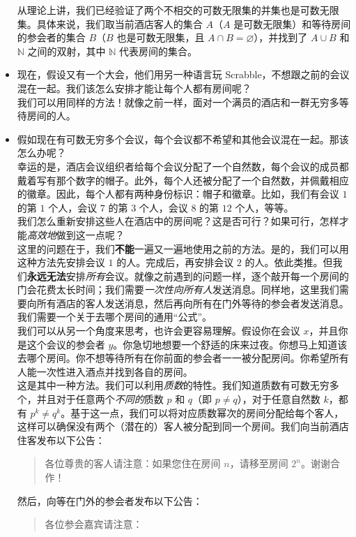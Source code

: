 \begin{itemize}
          从理论上讲，我们已经验证了两个不相交的可数无限集的并集也是可数无限集。具体来说，我们取当前酒店客人的集合 $A$（$A$ 是可数无限集）和等待房间的参会者的集合 $B$（$B$ 也是可数无限集，且 $A \cap B = \varnothing$），并找到了 $A \cup B$ 和 $\mathbb{N}$ 之间的双射，其中 $\mathbb{N}$ 代表房间的集合。\\
    \item 现在，假设又有一个大会，他们用另一种语言玩 Scrabble，不想跟之前的会议混在一起。我们该怎么安排才能让每个人都有房间呢？\\

          我们可以用同样的方法！就像之前一样，面对一个满员的酒店和一群无穷多等待房间的人。\\
    \item 假如现在有可数无穷多个会议，每个会议都不希望和其他会议混在一起。那该怎么办呢？\\

          幸运的是，酒店会议组织者给每个会议分配了一个自然数，每个会议的成员都戴着写有那个数字的帽子。此外，每个人还被分配了一个自然数，并佩戴相应的徽章。因此，每个人都有两种身份标识：帽子和徽章。比如，我们有会议 $1$ 的第 $1$ 个人，会议 $7$ 的第 $3$ 个人，会议 $8$ 的第 $12$ 个人，等等。\\

          我们怎么重新安排这些人在酒店中的房间呢？这是否可行？如果可行，怎样才能\emph{高效地}做到这一点呢？\\

          这里的问题在于，我们\textbf{不能}一遍又一遍地使用之前的方法。是的，我们可以用这种方法先安排会议 $1$ 的人。完成后，再安排会议 $2$ 的人。依此类推。但我们\textbf{永远无法}安排\emph{所有}会议。就像之前遇到的问题一样，逐个敲开每一个房间的门会花费太长时间；我们需要\emph{一次性向所有人}发送消息。同样地，这里我们需要向所有酒店的客人发送消息，然后再向所有在门外等待的参会者发送消息。我们需要一个关于去哪个房间的通用``公式''。\\

          我们可以从另一个角度来思考，也许会更容易理解。假设你在会议 $x$，并且你是这个会议的参会者 $y$。你急切地想要一个舒适的床来过夜。你想马上知道该去哪个房间。你不想等待所有在你前面的参会者一一被分配房间。你希望所有人能一次性进入酒点并找到各自的房间。\\

          这是其中一种方法。我们可以利用\emph{质数}的特性。我们知道质数有可数无穷多个，并且对于任意两个\emph{不同的}质数 $p$ 和 $q$（即 $p \ne q$），对于任意自然数 $k$，都有 $p^k \ne q^k$。基于这一点，我们可以将对应质数幂次的房间分配给每个客人，这样可以确保没有两个（潜在的）客人被分配到同一个房间。我们向当前酒店住客发布以下公告：
          \begin{quotation}
              各位尊贵的客人请注意：如果您住在房间 $n$，请移至房间 $2^n$。谢谢合作！
          \end{quotation}
          然后，向等在门外的参会者发布以下公告：
          \begin{quotation}
              各位参会嘉宾请注意：


\end{quotation}
\end{itemize}

